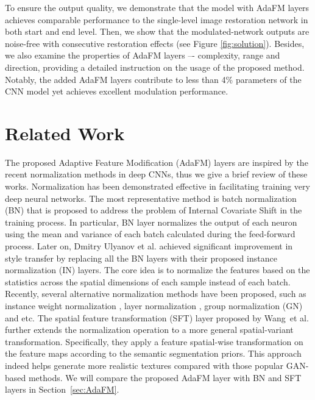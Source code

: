 \documentclass[10pt,twocolumn,letterpaper]{article}
\begin{document}
To ensure the output quality, we demonstrate that the model with AdaFM layers achieves comparable performance to the single-level image restoration network in both start and end level. Then, we show that the modulated-network outputs are noise-free with consecutive restoration effects (see Figure \ref{fig:solution}). Besides, we also examine the properties of AdaFM layers –- complexity, range and direction, providing a detailed instruction on the usage of the proposed method. Notably, the added AdaFM layers contribute to less than 4\% parameters of the CNN model yet achieves excellent modulation performance. 


\section{Related Work}


The proposed Adaptive Feature Modification (AdaFM) layers are inspired by the recent normalization methods in deep CNNs, thus we give a brief review of these works. Normalization has been demonstrated effective in facilitating training very deep neural networks. 
The most representative method is batch normalization (BN) \cite{Ioffe2015BatchNA} that is proposed to address the problem of Internal Covariate Shift in the training process. In particular, BN layer normalizes the output of each neuron using the mean and variance of each batch calculated during the feed-forward process. 
Later on, Dmitry Ulyanov et al. \cite{DBLP:journals/corr/UlyanovVL16} achieved significant improvement in style transfer by replacing all the BN layers with their proposed instance normalization (IN) layers. The core idea is to normalize the features based on the statistics across the spatial dimensions of each sample instead of each batch. 
Recently, several alternative normalization methods have been proposed, such as instance weight normalization \cite{salimans2016weight}, layer normalization \cite{Ba2016LayerN}, group normalization (GN) \cite{wu2018group} and etc.
The spatial feature transformation (SFT) layer proposed by Wang~et al. \cite{wang2018recovering} further extends the normalization operation to a more general spatial-variant transformation. Specifically, they apply a feature spatial-wise transformation on the feature maps according to the semantic segmentation priors. This approach indeed helps generate more realistic textures compared with those popular GAN-based methods. We will compare the proposed AdaFM layer with BN and SFT layers in Section~\ref{sec:AdaFM}.
\end{document}
